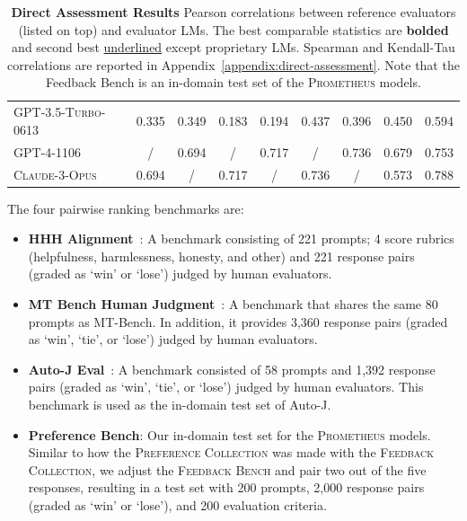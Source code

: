 \documentclass[11pt]{article}
\begin{document}
\begin{table}[t!]
{\begin{tabular}{lcccccccc}
    \textsc{GPT-3.5-Turbo-0613}&0.335&0.349&0.183&0.194&0.437& 0.396 & 0.450&0.594\\
    \textsc{GPT-4-1106}&/&0.694&/&0.717&/& 0.736 & 0.679&0.753\\
    \textsc{Claude-3-Opus}&0.694&/&0.717&/&0.736&/&0.573&0.788\\
    \bottomrule    
\end{tabular}}
\caption{\footnotesize \textbf{Direct Assessment Results} Pearson correlations between reference evaluators (listed on top) and evaluator LMs. The best comparable statistics are \textbf{bolded} and second best \underline{underlined} except proprietary LMs. Spearman and Kendall-Tau correlations are reported in Appendix~\ref{appendix:direct-assessment}. Note that the Feedback Bench is an in-domain test set of the \textsc{Prometheus} models.}
\label{table:direct-assessment}
\end{table}
















The four pairwise ranking benchmarks are:


\begin{itemize}
    \item \textbf{HHH Alignment}~\citep{askell2021general}: A benchmark consisting of 221 prompts; 4 score rubrics (helpfulness, harmlessness, honesty, and other) and 221 response pairs (graded as `win' or `lose') judged by human evaluators.
    \item \textbf{MT Bench Human Judgment}~\citep{zheng2023judging}: A benchmark that shares the same 80 prompts as MT-Bench. In addition, it provides 3,360 response pairs (graded as `win', `tie', or `lose') judged by human evaluators.
    \item \textbf{Auto-J Eval}~\citep{li2023generative}: A benchmark consisted of 58 prompts and 1,392 response pairs (graded as `win', `tie', or `lose') judged by human evaluators. This benchmark is used as the in-domain test set of Auto-J.
    \item \textbf{Preference Bench}: Our in-domain test set for the \textsc{Prometheus} models. Similar to how the \textsc{Preference Collection} was made with the \textsc{Feedback Collection}, we adjust the \textsc{Feedback Bench} and pair two out of the five responses, resulting in a test set with 200 prompts, 2,000 response pairs (graded as `win' or `lose'), and 200 evaluation criteria.
\end{itemize}
\end{document}
